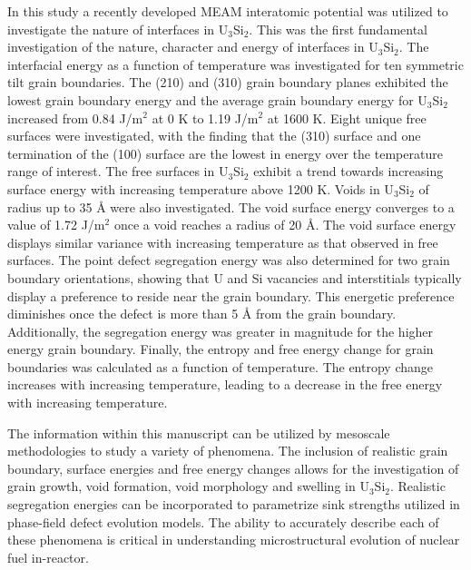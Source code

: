 \documentclass[review]{elsarticle}
\begin{document}
In this study a recently developed MEAM interatomic potential was utilized to investigate the nature of interfaces in U$_{3}$Si$_{2}$. This was the first fundamental investigation of the nature, character and energy of interfaces in U$_{3}$Si$_{2}$. The interfacial energy as a function of temperature was investigated for ten symmetric tilt grain boundaries. The (210) and (310) grain boundary planes exhibited the lowest grain boundary energy and the average grain boundary energy for U$_{3}$Si$_{2}$ increased from 0.84 J/m$^{2}$ at 0 K to 1.19 J/m$^{2}$ at 1600 K. Eight unique free surfaces were investigated, with the finding that the (310) surface and one termination of the (100) surface are the lowest in energy over the temperature range of interest. The free surfaces in U$_{3}$Si${_2}$ exhibit a trend towards increasing surface energy with increasing temperature above 1200 K. Voids in U$_{3}$Si$_{2}$ of radius up to 35 {\AA} were also investigated. The void surface energy converges to a value of 1.72 J/m$^{2}$ once a void reaches a radius of 20 {\AA}. The void surface energy displays similar variance with increasing temperature as that observed in free surfaces. The point defect segregation energy was also determined for two grain boundary orientations, showing that U and Si vacancies and interstitials typically display a preference to reside near the grain boundary. This energetic preference diminishes once the defect is more than 5 {\AA} from the grain boundary. Additionally, the segregation energy was greater in magnitude for the higher energy grain boundary. Finally, the entropy and free energy change for grain boundaries was calculated as a function of temperature. The entropy change increases with increasing temperature, leading to a decrease in the free energy with increasing temperature. 

The information within this manuscript can be utilized by mesoscale methodologies to study a variety of phenomena. The inclusion of realistic grain boundary, surface energies and free energy changes allows for the investigation of grain growth, void formation, void morphology and swelling in U$_{3}$Si$_{2}$. Realistic segregation energies can be incorporated to parametrize sink strengths utilized in phase-field defect evolution models. The ability to accurately describe each of these phenomena is critical in understanding microstructural evolution of nuclear fuel in-reactor. 
\end{document}
